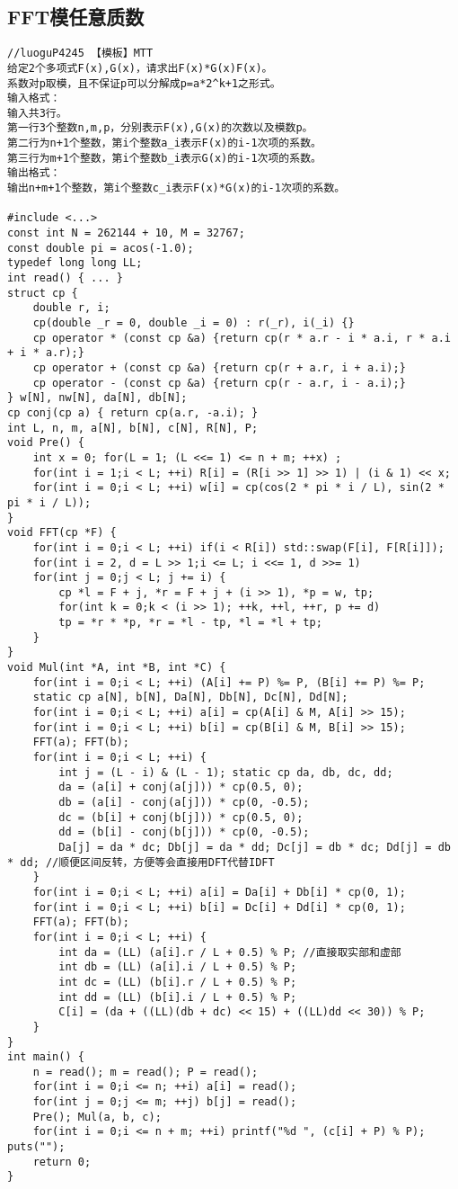 \documentclass{article}
\begin{document}
\subsection{FFT模任意质数}
\begin{lstlisting}
//luoguP4245 【模板】MTT
给定2个多项式F(x),G(x)，请求出F(x)*G(x)F(x)。
系数对p取模，且不保证p可以分解成p=a*2^k+1之形式。
输入格式：
输入共3行。
第一行3个整数n,m,p，分别表示F(x),G(x)的次数以及模数p。
第二行为n+1个整数，第i个整数a_i表示F(x)的i-1次项的系数。
第三行为m+1个整数，第i个整数b_i表示G(x)的i-1次项的系数。
输出格式：
输出n+m+1个整数，第i个整数c_i表示F(x)*G(x)的i-1次项的系数。

#include <...>
const int N = 262144 + 10, M = 32767;
const double pi = acos(-1.0);
typedef long long LL;
int read() { ... }
struct cp {
	double r, i;
	cp(double _r = 0, double _i = 0) : r(_r), i(_i) {}
	cp operator * (const cp &a) {return cp(r * a.r - i * a.i, r * a.i + i * a.r);}
	cp operator + (const cp &a) {return cp(r + a.r, i + a.i);}
	cp operator - (const cp &a) {return cp(r - a.r, i - a.i);}
} w[N], nw[N], da[N], db[N];
cp conj(cp a) { return cp(a.r, -a.i); }
int L, n, m, a[N], b[N], c[N], R[N], P;
void Pre() {
	int x = 0; for(L = 1; (L <<= 1) <= n + m; ++x) ;
	for(int i = 1;i < L; ++i) R[i] = (R[i >> 1] >> 1) | (i & 1) << x;
	for(int i = 0;i < L; ++i) w[i] = cp(cos(2 * pi * i / L), sin(2 * pi * i / L));
}
void FFT(cp *F) {
	for(int i = 0;i < L; ++i) if(i < R[i]) std::swap(F[i], F[R[i]]);
	for(int i = 2, d = L >> 1;i <= L; i <<= 1, d >>= 1) 
	for(int j = 0;j < L; j += i) {
		cp *l = F + j, *r = F + j + (i >> 1), *p = w, tp;
		for(int k = 0;k < (i >> 1); ++k, ++l, ++r, p += d) 
		tp = *r * *p, *r = *l - tp, *l = *l + tp;
	}
}
void Mul(int *A, int *B, int *C) {
	for(int i = 0;i < L; ++i) (A[i] += P) %= P, (B[i] += P) %= P;
	static cp a[N], b[N], Da[N], Db[N], Dc[N], Dd[N];
	for(int i = 0;i < L; ++i) a[i] = cp(A[i] & M, A[i] >> 15);
	for(int i = 0;i < L; ++i) b[i] = cp(B[i] & M, B[i] >> 15);
	FFT(a); FFT(b);
	for(int i = 0;i < L; ++i) {
		int j = (L - i) & (L - 1); static cp da, db, dc, dd;
		da = (a[i] + conj(a[j])) * cp(0.5, 0);
		db = (a[i] - conj(a[j])) * cp(0, -0.5);
		dc = (b[i] + conj(b[j])) * cp(0.5, 0);
		dd = (b[i] - conj(b[j])) * cp(0, -0.5);
		Da[j] = da * dc; Db[j] = da * dd; Dc[j] = db * dc; Dd[j] = db * dd; //顺便区间反转，方便等会直接用DFT代替IDFT 
	}
	for(int i = 0;i < L; ++i) a[i] = Da[i] + Db[i] * cp(0, 1);
	for(int i = 0;i < L; ++i) b[i] = Dc[i] + Dd[i] * cp(0, 1);
	FFT(a); FFT(b);
	for(int i = 0;i < L; ++i) {
		int da = (LL) (a[i].r / L + 0.5) % P; //直接取实部和虚部 
		int db = (LL) (a[i].i / L + 0.5) % P;
		int dc = (LL) (b[i].r / L + 0.5) % P;
		int dd = (LL) (b[i].i / L + 0.5) % P;
		C[i] = (da + ((LL)(db + dc) << 15) + ((LL)dd << 30)) % P; 
	}
}
int main() {
	n = read(); m = read(); P = read();
	for(int i = 0;i <= n; ++i) a[i] = read();
	for(int j = 0;j <= m; ++j) b[j] = read();
	Pre(); Mul(a, b, c); 
	for(int i = 0;i <= n + m; ++i) printf("%d ", (c[i] + P) % P); puts("");
	return 0;
}


\end{lstlisting}
\end{document}
